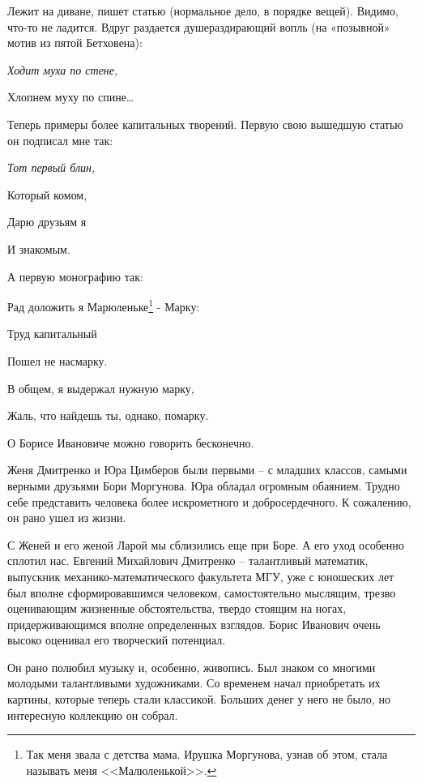 \indent		

	Лежит на диване, пишет статью (нормальное дело, в порядке вещей). Видимо, что-то не ладится. Вдруг раздается душераздирающий вопль (на «позывной» мотив из пятой Бетховена):

\indent

{\itshape
		Ходит муха по стене,
		
		Хлопнем муху по спине…
}		

\indent

Теперь примеры более капитальных творений. Первую свою вышедшую статью он подписал мне так:

\indent

{\itshape
		Тот первый блин,
		
        Который комом,
        
        Дарю друзьям я
        
        И знакомым.
}

\indent

\noindent
А первую монографию так:

\indent

{\itshape	

	Рад доложить я Марюленьке\footnote{Так меня звала с детства мама. Ирушка Моргунова, узнав об этом, стала называть меня <<Малюленькой>>.} - Марку:

	Труд капитальный
	
	Пошел не насмарку.
	
	В общем, я выдержал нужную марку,
	
	Жаль, что найдешь ты, однако, помарку.
}	

\indent

О Борисе Ивановиче можно говорить бесконечно.

Женя Дмитренко и Юра Цимберов были первыми – с младших классов, самыми верными друзьями Бори Моргунова. Юра обладал огромным обаянием. Трудно себе представить человека более искрометного и добросердечного. К сожалению, он рано ушел из жизни.

С Женей и его женой Ларой мы сблизились еще при Боре. А его уход особенно сплотил нас. Евгений Михайлович Дмитренко – талантливый математик, выпускник механико-математического факультета МГУ, уже с юношеских лет был вполне сформировавшимся человеком, самостоятельно мыслящим, трезво оценивающим жизненные обстоятельства, твердо стоящим на ногах, придерживающимся вполне определенных взглядов. Борис Иванович очень высоко оценивал его творческий потенциал.

Он рано полюбил музыку и, особенно, живопись. Был знаком со многими молодыми талантливыми художниками. Со временем начал приобретать их картины, которые теперь стали классикой. Больших денег у него не было, но интересную коллекцию он собрал.

